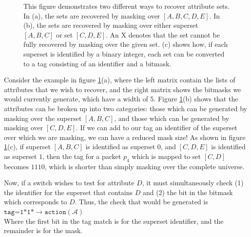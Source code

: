 \begin{figure}[t!]
\begin{minipage}{1\linewidth}
\begin{subfigure}[c]{0.96\linewidth}
\end{subfigure} 
\end{minipage} 
\caption{This figure demonstrates two different ways to recover attribute sets. In (a), the sets are recovered by masking over $[A,B,C,D,E]$. In (b), the sets are recovered by masking over either superset $[A,B,C]$ or set $[C,D,E]$. An X denotes that the set cannot be fully recovered by masking over the given set. (c) shows how, if each superset is identified by a binary integer, each set can be converted to a tag consisting of an identifier and a bitmask.}
\label{fig:masking}
\end{figure}

Consider the example in figure \ref{fig:masking}(a), where the left matrix contain the lists of attributes that we wish to recover, and the right matrix shows the bitmasks we would currently generate, which have a width of 5. Figure \ref{fig:masking}(b) shows that the attributes can be broken up into two categories: those which can be generated by masking over the superset $[A,B,C]$, and those which can be generated by masking over $[C,D,E]$. If we can add to our tag an identifier of the superset over which we are masking, we can have a reduced mask size! As shown in figure \ref{fig:masking}(c), if superset $[A,B,C]$ is identified as superset $0$, and $[C,D,E]$ is identified as superset $1$, then the tag for a packet $p_4$ which is mapped to set $[C,D]$ becomes $1110$, which is shorter than simply masking over the complete universe.

Now, if a switch wishes to test for attribute $D$, it must simultaneously check (1) the identifier for the superset that contains $D$ and (2) the bit in the bitmask which corresponds to $D$. Thus, the check that would be generated is\\
\noindent
{%
$\texttt{tag=1*1*} \rightarrow \texttt{action}(\mathcal{A})$\\
}
Where the first bit in the tag match is for the superset identifier, and the
remainder is for the mask.

